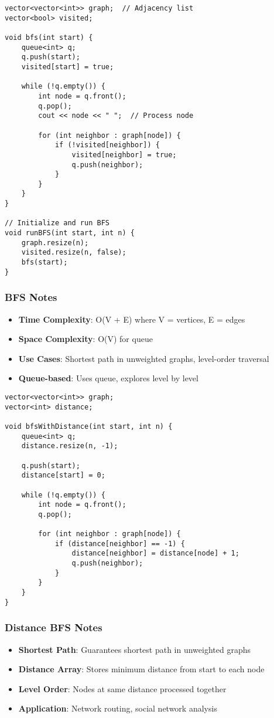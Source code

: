 \documentclass[11pt,a4paper]{article}
\begin{document}
\begin{lstlisting}[caption={BFS Implementation}]
vector<vector<int>> graph;  // Adjacency list
vector<bool> visited;

void bfs(int start) {
    queue<int> q;
    q.push(start);
    visited[start] = true;
    
    while (!q.empty()) {
        int node = q.front();
        q.pop();
        cout << node << " ";  // Process node
        
        for (int neighbor : graph[node]) {
            if (!visited[neighbor]) {
                visited[neighbor] = true;
                q.push(neighbor);
            }
        }
    }
}

// Initialize and run BFS
void runBFS(int start, int n) {
    graph.resize(n);
    visited.resize(n, false);
    bfs(start);
}
\end{lstlisting}

\subsubsection{BFS Notes}
\begin{itemize}
\item \textbf{Time Complexity}: O(V + E) where V = vertices, E = edges
\item \textbf{Space Complexity}: O(V) for queue
\item \textbf{Use Cases}: Shortest path in unweighted graphs, level-order traversal
\item \textbf{Queue-based}: Uses queue, explores level by level
\end{itemize}

\newpage
\begin{lstlisting}[caption={BFS with Distance Calculation}]
vector<vector<int>> graph;
vector<int> distance;

void bfsWithDistance(int start, int n) {
    queue<int> q;
    distance.resize(n, -1);
    
    q.push(start);
    distance[start] = 0;
    
    while (!q.empty()) {
        int node = q.front();
        q.pop();
        
        for (int neighbor : graph[node]) {
            if (distance[neighbor] == -1) {
                distance[neighbor] = distance[node] + 1;
                q.push(neighbor);
            }
        }
    }
}
\end{lstlisting}

\subsubsection{Distance BFS Notes}
\begin{itemize}
\item \textbf{Shortest Path}: Guarantees shortest path in unweighted graphs
\item \textbf{Distance Array}: Stores minimum distance from start to each node
\item \textbf{Level Order}: Nodes at same distance processed together
\item \textbf{Application}: Network routing, social network analysis
\end{itemize}
\end{document}

